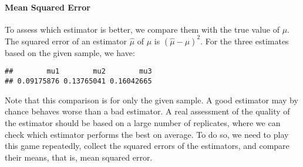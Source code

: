 \paragraph{Mean Squared Error}

To assess which estimator is better, we compare them with the true value of
$\mu$. The squared error of an estimator $\hat\mu$ of $\mu$ is
$(\hat\mu - \mu)^2$.
For the three estimates based on the given sample, we have:
\begin{knitrout}
\color{fgcolor}\begin{kframe}
\begin{alltt}
 \hlopt{-} \hlopt{^}
\end{alltt}
\begin{verbatim}
##        mu1        mu2        mu3 
## 0.09175876 0.13765041 0.16042665
\end{verbatim}
\end{kframe}
\end{knitrout}


Note that this comparison is for only the given sample. A good estimator may by
chance behaves worse than a bad estimator. A real assessment of the quality of
the estimator should be based on a large number of replicates, where we can
check which estimator performs the best on average. To do so, we need to play
this game repeatedly, collect the squared errors of the estimators, and compare
their means, that is, mean squared error.


